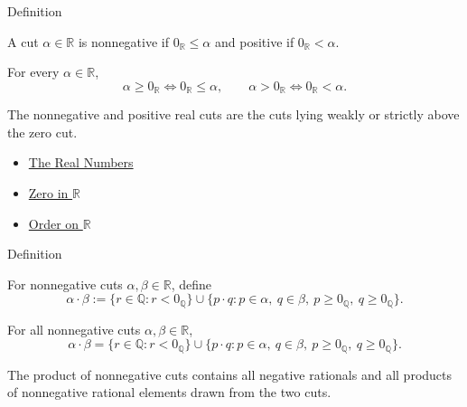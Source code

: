 \begin{definitionbox}{Definition}
\begin{definition}
\label{def:nonnegative-cut}
A cut $\alpha\in\mathbb{R}$ is nonnegative if $0_{\mathbb{R}}\le\alpha$ and
positive if $0_{\mathbb{R}}<\alpha$.
\end{definition}
\end{definitionbox}

\begin{remark*}
For every $\alpha\in\mathbb{R}$,
\[
\alpha\ge 0_{\mathbb{R}}\Longleftrightarrow 0_{\mathbb{R}}\le\alpha,
\qquad
\alpha>0_{\mathbb{R}}\Longleftrightarrow 0_{\mathbb{R}}<\alpha.
\]
\end{remark*}

\begin{remark*}[Interpretation]
The nonnegative and positive real cuts are the cuts lying weakly or strictly
above the zero cut.
\end{remark*}

\begin{dependencies}
\begin{itemize}
  \item \hyperref[def:reals]{The Real Numbers}
  \item \hyperref[def:zero-in-r]{Zero in $\mathbb{R}$}
  \item \hyperref[def:order-on-r]{Order on $\mathbb{R}$}
\end{itemize}
\end{dependencies}

\begin{definitionbox}{Definition}
\begin{definition}
\label{def:product-nonnegative-on-r}
For nonnegative cuts $\alpha,\beta\in\mathbb{R}$, define
\[
\alpha\cdot\beta
:=
\{r\in\mathbb{Q}:r<0_{\mathbb{Q}}\}
\cup
\{p\cdot q:p\in\alpha,\ q\in\beta,\ p\ge 0_{\mathbb{Q}},\ q\ge 0_{\mathbb{Q}}\}.
\]
\end{definition}
\end{definitionbox}

\begin{remark*}
For all nonnegative cuts $\alpha,\beta\in\mathbb{R}$,
\[
\alpha\cdot\beta
=
\{r\in\mathbb{Q}:r<0_{\mathbb{Q}}\}
\cup
\{p\cdot q:p\in\alpha,\ q\in\beta,\ p\ge 0_{\mathbb{Q}},\ q\ge 0_{\mathbb{Q}}\}.
\]
\end{remark*}

\begin{remark*}[Interpretation]
The product of nonnegative cuts contains all negative rationals and all
products of nonnegative rational elements drawn from the two cuts.
\end{remark*}

